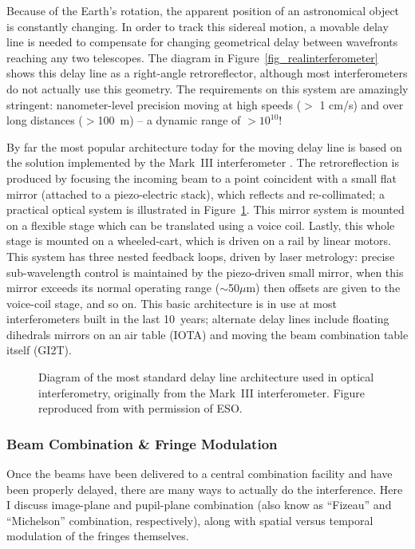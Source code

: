 \documentclass[12pt]{article}
\begin{document}
Because of the Earth's rotation, the apparent position of an
astronomical object is constantly changing.  In order to track this
sidereal motion, a movable delay line is needed to compensate for
changing geometrical delay between wavefronts reaching any two
telescopes.  The diagram in Figure~\ref{fig_realinterferometer} shows this delay line as a right-angle
retroreflector, although most interferometers do not actually use this
geometry.  The requirements on this system are amazingly stringent:
nanometer-level precision moving at high speeds ($>$ 1 cm/s) and over
long distances ($>$100~m) -- a dynamic range of $>10^{10}$!

By far the most popular architecture today for the moving delay line
is based on the solution implemented by the Mark~III interferometer
\citep{markiii,colavita1992}.  The retroreflection is produced by
focusing the incoming beam to a point coincident with a small flat
mirror (attached to a piezo-electric stack), which reflects and 
re-collimated; a practical optical system is illustrated in
Figure~\ref{jpl_dl}.  This mirror system is mounted on a flexible
stage which can be translated using a voice coil.  Lastly, this whole
stage is mounted on a wheeled-cart, which is driven on a rail by
linear motors.  This system has three nested feedback loops, driven by
laser metrology: precise sub-wavelength control is maintained by the
piezo-driven small mirror, when this mirror exceeds its normal
operating range ($\sim$50$\mu$m) then offsets are given to the
voice-coil stage, and so on.  This basic architecture is in use at
most interferometers built in the last 10~years; alternate delay lines
include floating dihedrals mirrors on an air table (IOTA) and moving
the beam combination table itself (GI2T).

\begin{figure}
\begin{center}
\caption
{Diagram of the most standard delay line architecture used
in optical interferometry, originally from the Mark~III interferometer.
Figure reproduced from \citet[][Figure 4]{markiii} with permission of 
ESO.
\label{jpl_dl}}
\end{center}
\end{figure}

\subsubsection{Beam Combination \& Fringe Modulation}
\label{combiners}
Once the beams have been delivered to a central combination facility
and have been properly delayed, there are many ways to actually do the
interference.  Here I discuss image-plane and pupil-plane combination
(also know as ``Fizeau'' and ``Michelson'' combination, respectively),
along with spatial versus temporal modulation of the fringes themselves.
\end{document}
